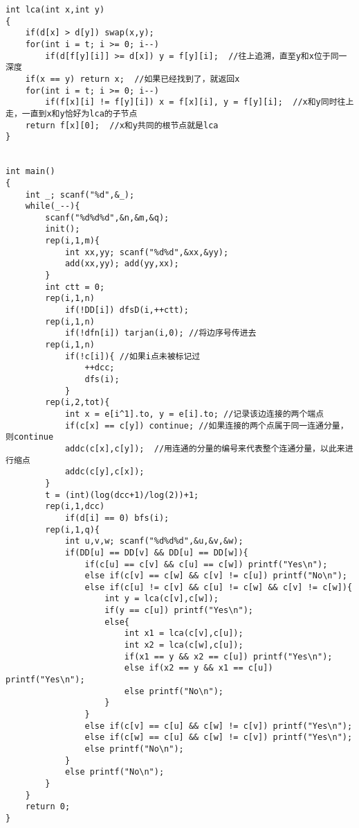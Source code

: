 \documentclass[twoside]{article}
\begin{document}
\begin{lstlisting}
int lca(int x,int y)
{
	if(d[x] > d[y]) swap(x,y);
	for(int i = t; i >= 0; i--)
		if(d[f[y][i]] >= d[x]) y = f[y][i];  //往上追溯，直至y和x位于同一深度
	if(x == y) return x;  //如果已经找到了，就返回x
	for(int i = t; i >= 0; i--)
		if(f[x][i] != f[y][i]) x = f[x][i], y = f[y][i];  //x和y同时往上走，一直到x和y恰好为lca的子节点
	return f[x][0];  //x和y共同的根节点就是lca 
}


int main()
{
	int _; scanf("%d",&_);
	while(_--){
		scanf("%d%d%d",&n,&m,&q);
		init();
		rep(i,1,m){
			int xx,yy; scanf("%d%d",&xx,&yy);
			add(xx,yy); add(yy,xx);
		}
		int ctt = 0;
		rep(i,1,n)
			if(!DD[i]) dfsD(i,++ctt);
		rep(i,1,n)
			if(!dfn[i]) tarjan(i,0); //将边序号传进去
		rep(i,1,n)
			if(!c[i]){ //如果i点未被标记过
				++dcc;
				dfs(i);
			}
		rep(i,2,tot){
			int x = e[i^1].to, y = e[i].to; //记录该边连接的两个端点
			if(c[x] == c[y]) continue; //如果连接的两个点属于同一连通分量，则continue
			addc(c[x],c[y]);  //用连通的分量的编号来代表整个连通分量，以此来进行缩点
			addc(c[y],c[x]);
		}
		t = (int)(log(dcc+1)/log(2))+1;
		rep(i,1,dcc)
			if(d[i] == 0) bfs(i);
		rep(i,1,q){
			int u,v,w; scanf("%d%d%d",&u,&v,&w);
			if(DD[u] == DD[v] && DD[u] == DD[w]){
				if(c[u] == c[v] && c[u] == c[w]) printf("Yes\n");
				else if(c[v] == c[w] && c[v] != c[u]) printf("No\n");
				else if(c[u] != c[v] && c[u] != c[w] && c[v] != c[w]){
					int y = lca(c[v],c[w]);
					if(y == c[u]) printf("Yes\n");
					else{
						int x1 = lca(c[v],c[u]);
						int x2 = lca(c[w],c[u]);
						if(x1 == y && x2 == c[u]) printf("Yes\n");
						else if(x2 == y && x1 == c[u]) printf("Yes\n");
						else printf("No\n");
					}
				}
				else if(c[v] == c[u] && c[w] != c[v]) printf("Yes\n");
				else if(c[w] == c[u] && c[w] != c[v]) printf("Yes\n");
				else printf("No\n");
			}
			else printf("No\n");
		}
	}
	return 0;
}
\end{lstlisting}
\end{document}
